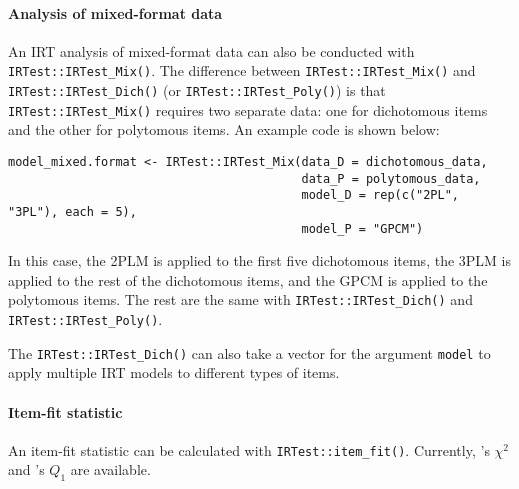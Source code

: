 \hypertarget{analysis-of-mixed-format-data}{%
\paragraph*{Analysis of mixed-format data}\label{analysis-of-mixed-format-data}}

An IRT analysis of mixed-format data can also be conducted with
\texttt{IRTest::IRTest\_Mix()}. The difference between \texttt{IRTest::IRTest\_Mix()}
and \texttt{IRTest::IRTest\_Dich()} (or \texttt{IRTest::IRTest\_Poly()}) is that
\texttt{IRTest::IRTest\_Mix()} requires two separate data: one for dichotomous
items and the other for polytomous items. An example code is shown
below:

\begin{verbatim}
model_mixed.format <- IRTest::IRTest_Mix(data_D = dichotomous_data,
                                         data_P = polytomous_data,
                                         model_D = rep(c("2PL", "3PL"), each = 5),
                                         model_P = "GPCM")
\end{verbatim}

In this case, the 2PLM is applied to the first five dichotomous items,
the 3PLM is applied to the rest of the dichotomous items, and the GPCM
is applied to the polytomous items. The rest are the same with
\texttt{IRTest::IRTest\_Dich()} and \texttt{IRTest::IRTest\_Poly()}.

The \texttt{IRTest::IRTest\_Dich()} can also take a vector for the argument
\texttt{model} to apply multiple IRT models to different types of items.

\hypertarget{item-fit-statistic}{%
\paragraph*{Item-fit statistic}\label{item-fit-statistic}}

An item-fit statistic can be calculated with \texttt{IRTest::item\_fit()}.
Currently, \citet{Bock:1960}'s \(\chi^{2}\) and \citet{Yen:1981}'s \(Q_{1}\) are
available.



\address{%
Seewoo Li\\
University of California, Los Angeles\\%
Social Research Methodology\\ School of Education \& Information Studies\\ Los Angeles, California\\ \emph{ORCiD: \href{https://orcid.org/0000-0002-6290-2777}{0000-0002-6290-2777}}\\ \href{mailto:seewooli@g.ucla.edu}{\texttt{seewooli@g.ucla.edu}}\\
%
%
%
%
}

